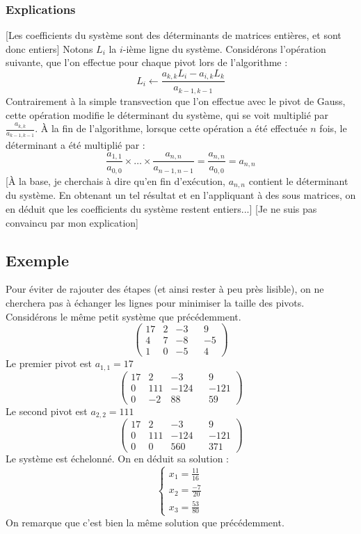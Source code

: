 \documentclass[french]{article}
\begin{document}
\subsubsection{Explications}
[Les coefficients du système sont des déterminants de matrices entières, et sont donc entiers]
\newline
Notons $L_i$ la $i$-ième ligne du système. Considérons l'opération suivante, que l'on effectue pour chaque pivot lors de l'algorithme :
$$L_i \gets \frac{a_{k,k} L_i - a_{i,k} L_k}{a_{k-1,k-1}}$$
Contrairement à la simple transvection que l'on effectue avec le pivot de Gauss, cette opération modifie le déterminant du système, qui se voit multiplié par $\frac{a_{k,k}}{a_{k-1,k-1}}$. À la fin de l'algorithme, lorsque cette opération a été effectuée $n$ fois, le déterminant a été multiplié par :
$$\frac{a_{1,1}}{a_{0,0}} \times \hdots \times \frac{a_{n,n}}{a_{n-1,n-1}} = \frac{a_{n,n}}{a_{0,0}} = a_{n,n}$$
[À la base, je cherchais à dire qu'en fin d'exécution, $a_{n,n}$ contient le déterminant du système. En obtenant un tel résultat et en l'appliquant à des sous matrices, on en déduit que les coefficients du système restent entiers...] [Je ne suis pas convaincu par mon explication]
\subsection{Exemple}
Pour éviter de rajouter des étapes (et ainsi rester à peu près lisible), on ne cherchera pas à échanger les lignes pour minimiser la taille des pivots. Considérons le même petit système que précédemment.
\begin{equation*}
	\begin{pmatrix}
		17 & 2 & -3 & & 9\\
		4 & 7 & -8 & & -5\\
		1 & 0 & -5 & & 4
	\end{pmatrix}
\end{equation*}
Le premier pivot est $a_{1,1} = 17$
\begin{equation*}
	\begin{pmatrix}
		17 & 2 & -3 & & 9\\
		0 & 111 & -124 & & -121\\
		0 & -2 & 88 & & 59
	\end{pmatrix}
\end{equation*}
Le second pivot est $a_{2,2} = 111$
\begin{equation*}
	\begin{pmatrix}
		17 & 2 & -3  & & 9\\
		0 & 111 & -124 & & -121\\
		0 & 0 & 560 & & 371
	\end{pmatrix}
\end{equation*}
Le système est échelonné. On en déduit sa solution :
\begin{equation*}
	\begin{cases}
		x_1 = \frac{11}{16}\\
		x_2 = \frac{-7}{20}\\
		x_3 = \frac{53}{80}
	\end{cases}
\end{equation*}
On remarque que c'est bien la même solution que précédemment.
\end{document}
